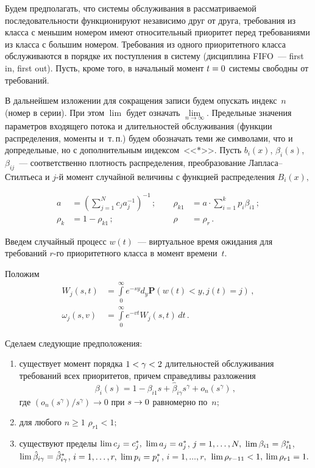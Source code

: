\begin{multicols}{2}
Будем предполагать, что системы обслуживания в рассматриваемой последовательности 
функционируют независимо друг от друга, требования из класса с меньшим номером имеют 
относительный приоритет перед требованиями из класса с большим номером.  Требования 
из одного приоритетного класса обслуживаются в порядке их поступления в сис\-те\-му 
(дисциплина FIFO~--- first in, first out). Пусть, кроме того, в начальный момент $t\hm=0$ 
сис\-те\-мы свободны  от требований.

В дальнейшем изложении для сокращения записи будем опускать индекс~$n$ 
(номер в серии). При этом $\lim$ будет означать
$\lim\limits_{n\rightarrow \infty}.$ Предельные значения параметров
входящего потока и длительностей обслуживания (функции
распределения, моменты и~т.\,п.) будем обозначать теми же символами,
что и допредельные, но с дополнительным индексом~<<$*$>>. Пусть
$b_i(x)$, $\beta_i(s)$, $\beta_{ij}$~--- соответственно плот\-ность
распределения, преобразование Лап\-ла\-са--Стилтье\-са и $j$-й момент
случайной величины с функцией распределения $B_i(x),$

\noindent
\begin{alignat*}{2}
a&=\left(\sum\limits_{j=1}^N c_ja_j^{-1}\right)^{-1}\,;\ &\quad
\rho_{k1}&=a\cdot\sum\limits_{i=1}^k p_i\beta_{i1}\,;\\
\rho_{k}&=1-\rho_{k1}\,;\ &\quad \rho&=\rho_{r}\,.
\end{alignat*}

Введем случайный процесс
$w(t)$~--- виртуальное время ожидания для требований $r$-го приоритетного 
класса в момент времени~$t$.

Положим
\begin{align*}
W_{j}(s,t)&=\int\limits_0^{\infty}e^{-sy}d_y\mathbf{P}(w(t)<y,j(t)=j)\,,\\
\omega_{j}(s,v)&=\int\limits_0^{\infty}e^{-vt}
W_{j}(s,t)\,dt\,.
\end{align*}

Сделаем следующие предположения:
\begin{enumerate}[(1)]
\item существует  момент порядка $1\hm<\gamma\hm<2$ длительностей обслуживания 
требований всех приоритетов, причем справедливы разложения
\begin{equation}
\label{2}
\beta_i(s)=1-\beta_{i1}s+\hat{\beta}_{i\gamma}s^{\gamma}+o_n(s^{\gamma})\,,
\end{equation}
где $({o_n(s^{\gamma})}/s^{\gamma})\rightarrow 0$ при $s\hm\rightarrow 0$ равномерно по~$n;$
\item для любого $n\geqslant 1$
$\rho_{r1}<1;$
\item
существуют пределы $\lim c_j\hm=c_j^*,$ $\lim a_j\hm=a_j^*$, $j\hm=1,\ldots,N,$
$\lim\beta_{i1}\hm=\beta_{i1}^*$, $\lim\hat{\beta}_{i\gamma}\hm=\hat{\beta}_{i\gamma}^*$, 
$i\hm=1,\ldots,r,$
$\lim p_i\hm=p_i^*$, $i=1,\ldots,r,$ $\lim\rho_{r-11}\hm<1,$ $\lim\rho_{r1}\hm=1.$
\end{enumerate}


\end{multicols}
